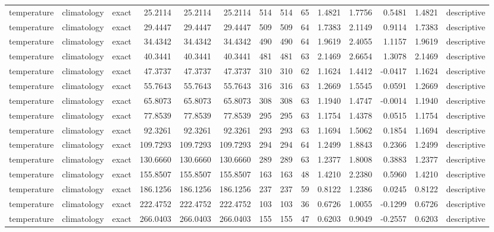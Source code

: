 \begin{tabular}{lllrrrrrrrrrrl}
temperature & climatology & exact & 25.2114 & 25.2114 & 25.2114 & 514 & 514 & 65 & 1.4821 & 1.7756 & 0.5481 & 1.4821 & descriptive \\
temperature & climatology & exact & 29.4447 & 29.4447 & 29.4447 & 509 & 509 & 64 & 1.7383 & 2.1149 & 0.9114 & 1.7383 & descriptive \\
temperature & climatology & exact & 34.4342 & 34.4342 & 34.4342 & 490 & 490 & 64 & 1.9619 & 2.4055 & 1.1157 & 1.9619 & descriptive \\
temperature & climatology & exact & 40.3441 & 40.3441 & 40.3441 & 481 & 481 & 63 & 2.1469 & 2.6654 & 1.3078 & 2.1469 & descriptive \\
temperature & climatology & exact & 47.3737 & 47.3737 & 47.3737 & 310 & 310 & 62 & 1.1624 & 1.4412 & -0.0417 & 1.1624 & descriptive \\
temperature & climatology & exact & 55.7643 & 55.7643 & 55.7643 & 316 & 316 & 63 & 1.2669 & 1.5545 & 0.0591 & 1.2669 & descriptive \\
temperature & climatology & exact & 65.8073 & 65.8073 & 65.8073 & 308 & 308 & 63 & 1.1940 & 1.4747 & -0.0014 & 1.1940 & descriptive \\
temperature & climatology & exact & 77.8539 & 77.8539 & 77.8539 & 295 & 295 & 63 & 1.1754 & 1.4378 & 0.0515 & 1.1754 & descriptive \\
temperature & climatology & exact & 92.3261 & 92.3261 & 92.3261 & 293 & 293 & 63 & 1.1694 & 1.5062 & 0.1854 & 1.1694 & descriptive \\
temperature & climatology & exact & 109.7293 & 109.7293 & 109.7293 & 294 & 294 & 64 & 1.2499 & 1.8843 & 0.2366 & 1.2499 & descriptive \\
temperature & climatology & exact & 130.6660 & 130.6660 & 130.6660 & 289 & 289 & 63 & 1.2377 & 1.8008 & 0.3883 & 1.2377 & descriptive \\
temperature & climatology & exact & 155.8507 & 155.8507 & 155.8507 & 163 & 163 & 48 & 1.4210 & 2.2380 & 0.5960 & 1.4210 & descriptive \\
temperature & climatology & exact & 186.1256 & 186.1256 & 186.1256 & 237 & 237 & 59 & 0.8122 & 1.2386 & 0.0245 & 0.8122 & descriptive \\
temperature & climatology & exact & 222.4752 & 222.4752 & 222.4752 & 103 & 103 & 36 & 0.6726 & 1.0055 & -0.1299 & 0.6726 & descriptive \\
temperature & climatology & exact & 266.0403 & 266.0403 & 266.0403 & 155 & 155 & 47 & 0.6203 & 0.9049 & -0.2557 & 0.6203 & descriptive \\

\end{tabular}
